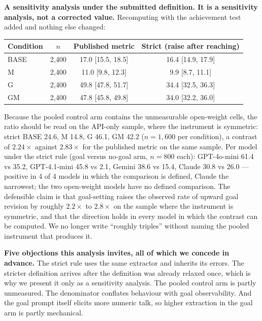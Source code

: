\textbf{A sensitivity analysis under the submitted definition. It is a sensitivity analysis, not
a corrected value.} Recomputing with the achievement test added and nothing else changed:

\begin{center}
\footnotesize
\begin{tabular}{lccc}
\toprule
\textbf{Condition} & $n$ & \textbf{Published metric} & \textbf{Strict (raise after reaching)} \\
\midrule
BASE & 2,400 & 17.0 [15.5, 18.5] & 16.4 [14.9, 17.9] \\
M    & 2,400 & 11.0 [9.8, 12.3]  & \phantom{0}9.9 [8.7, 11.1] \\
G    & 2,400 & 49.8 [47.8, 51.7] & 34.4 [32.5, 36.3] \\
GM   & 2,400 & 47.8 [45.8, 49.8] & 34.0 [32.2, 36.0] \\
\bottomrule
\end{tabular}
\end{center}

\noindent
Because the pooled control arm contains the unmeasurable open-weight cells, the ratio should be
read on the API-only sample, where the instrument is symmetric: strict BASE 24.6, M 14.8, G
46.1, GM 42.2 ($n = 1{,}600$ per condition), a contrast of $2.24\times$ against $2.83\times$
for the published metric on the same sample. Per model under the strict rule (goal versus
no-goal arm, $n = 800$ each): GPT-4o-mini 61.4 vs 35.2, GPT-4.1-mini 45.8 vs 2.1, Gemini 38.6
vs 15.4, Claude 30.8 vs 26.0 --- positive in 4 of 4 models in which the comparison is defined,
Claude the narrowest; the two open-weight models have no defined comparison. The defensible
claim is that goal-setting raises the observed rate of upward goal revision by roughly
$2.2\times$ to $2.8\times$ on the sample where the instrument is symmetric, and that the
direction holds in every model in which the contrast can be computed. We no longer write
``roughly triples'' without naming the pooled instrument that produces it.

\textbf{Five objections this analysis invites, all of which we concede in advance.} The strict
rule uses the same extractor and inherits its errors. The stricter definition arrives after the
definition was already relaxed once, which is why we present it only as a sensitivity analysis.
The pooled control arm is partly unmeasured. The denominator conflates behaviour with goal
observability. And the goal prompt itself elicits more numeric talk, so higher extraction in the
goal arm is partly mechanical.

